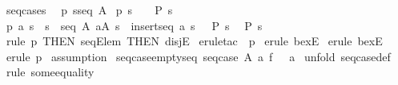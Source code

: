 \begin{isabellebody}
\isamarkupfalse%
\ seq{\isacharunderscore}cases{\isacharcolon}\ \isanewline
{}\ p{}{\isacharcolon}\ {\isachardoublequoteopen}s{\isacharcolon}seq\ A{\isachardoublequoteclose}\isanewline
{}\ p{}{\isacharcolon}\ {\isachardoublequoteopen}s\ {\isacharequal}\ {\isacharpercent}{\isacharless}{\isacharpercent}{\isachargreater}\ {\isacharequal}{\isacharequal}{\isachargreater}\ P\ s{\isachardoublequoteclose}\isanewline
{}\ p{}{\isacharcolon}\ {\isachardoublequoteopen}{\isacharbang}{\isacharbang}a\ s{\isacharprime}{\isachardot}\ {\isacharbrackleft}{\isacharbar}\ s{\isacharprime}\ {\isacharcolon}\ seq\ A{\isacharsemicolon}\ a{\isacharcolon}A{\isacharsemicolon}\ s\ {\isacharequal}\ {\isacharparenleft}insertseq\ a\ s{\isacharprime}{\isacharparenright}\ {\isacharbar}{\isacharbrackright}\ {\isacharequal}{\isacharequal}{\isachargreater}\ P\ s{\isachardoublequoteclose}\ \isanewline
{}\ {\isachardoublequoteopen}P\ s{\isachardoublequoteclose}\isanewline
%
\isadelimproof
%
\endisadelimproof
%
\isatagproof
{}\isamarkupfalse%
\ {\isacharparenleft}rule\ p{}\ {\isacharbrackleft}THEN\ seqE{\isacharunderscore}lem{\isacharcomma}\ THEN\ disjE{\isacharbrackright}{\isacharparenright}\isanewline
{}\isamarkupfalse%
\ {\isacharparenleft}erule{\isacharunderscore}tac\ {\isacharbrackleft}{}{\isacharbrackright}\ p{}{\isacharparenright}\isanewline
{}\isamarkupfalse%
\ {\isacharparenleft}erule\ bexE{\isacharparenright}\isanewline
{}\isamarkupfalse%
\ {\isacharparenleft}erule\ bexE{\isacharparenright}\isanewline
{}\isamarkupfalse%
\ {\isacharparenleft}erule\ p{}{\isacharparenright}\isanewline
{}\isamarkupfalse%
\ assumption{\isacharplus}\isanewline
{}\isamarkupfalse%
%
\endisatagproof
{\isafoldproof}%
%
\isadelimproof
\isanewline
%
\endisadelimproof
\isanewline
{}\isamarkupfalse%
\ seq{\isacharunderscore}case{\isacharunderscore}emptyseq{\isacharcolon}\ {\isachardoublequoteopen}seq{\isacharunderscore}case\ A\ a\ f\ {\isacharpercent}{\isacharless}{\isacharpercent}{\isachargreater}\ {\isacharequal}\ a{\isachardoublequoteclose}\isanewline
%
\isadelimproof
%
\endisadelimproof
%
\isatagproof
{}\isamarkupfalse%
\ {\isacharparenleft}unfold\ seq{\isacharunderscore}case{\isacharunderscore}def{\isacharparenright}\isanewline
{}\isamarkupfalse%
\ {\isacharparenleft}rule\ some{\isacharunderscore}equality{\isacharparenright}\isanewline

\end{isabellebody}
